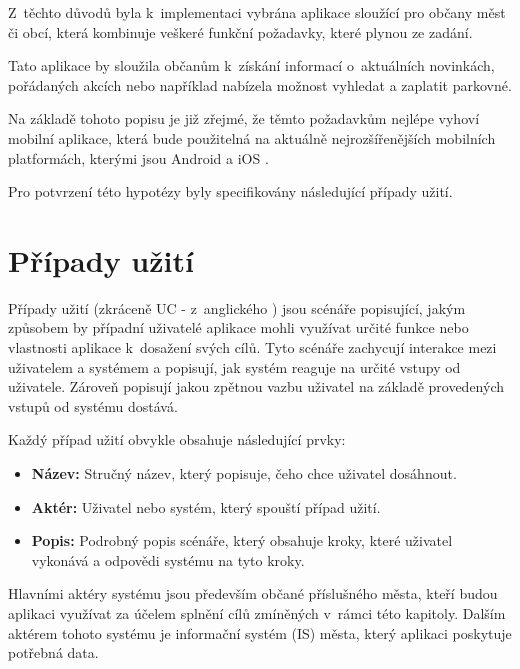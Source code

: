 Z~těchto důvodů byla k~implementaci vybrána aplikace sloužící pro občany měst či obcí, která kombinuje veškeré funkční požadavky, které plynou ze zadání.

Tato aplikace by sloužila občanům k~získání informací o~aktuálních novinkách, pořádaných akcích nebo například nabízela možnost vyhledat a zaplatit parkovné.

\medskip

Na základě tohoto popisu je již zřejmé, že těmto požadavkům nejlépe vyhoví mobilní aplikace, která bude použitelná na aktuálně nejrozšířenějších
mobilních platformách, kterými jsou Android a iOS \cite{iosAndroid}. 


Pro potvrzení této hypotézy byly specifikovány následující případy užití.

\section{Případy užití}
Případy užití  (zkráceně UC - z~anglického ) jsou scénáře popisující, jakým způsobem by případní uživatelé aplikace mohli využívat určité funkce nebo
vlastnosti aplikace k~dosažení svých cílů. \cite{figmaUseCase} Tyto scénáře zachycují interakce mezi uživatelem a systémem a popisují, jak systém reaguje na určité vstupy od 
uživatele. Zároveň popisují jakou zpětnou vazbu uživatel na základě provedených vstupů od systému dostává.

\medskip

Každý případ užití obvykle obsahuje následující prvky:

\begin{itemize}
  \item \textbf{Název:} Stručný název, který popisuje, čeho chce uživatel dosáhnout.
  \item \textbf{Aktér:} Uživatel nebo systém, který spouští případ užití.
  \item \textbf{Popis:} Podrobný popis scénáře, který obsahuje kroky, které uživatel vykonává a odpovědi systému na tyto kroky.
\end{itemize}

Hlavními aktéry systému jsou především občané příslušného města, kteří budou aplikaci využívat za účelem splnění cílů 
zmíněných v~rámci této kapitoly. 
Dalším aktérem tohoto systému je informační systém (IS) města, který aplikaci poskytuje potřebná data. 

